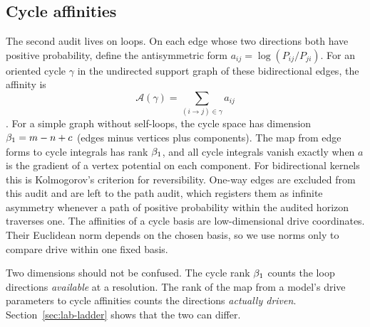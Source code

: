 \subsection{Cycle affinities}\label{sec:cycles}

The second audit lives on loops. On each edge whose two directions both have positive probability, define the antisymmetric form \(a_{ij}=\log(P_{ij}/P_{ji})\). For an oriented cycle \(\gamma\) in the undirected support graph of these bidirectional edges, the affinity is
\[
\mathcal A(\gamma)=\sum_{(i\to j)\in\gamma}a_{ij}
\]
\cite{schnakenberg1976network,esposito2010threefaces}. For a simple graph without self-loops, the cycle space has dimension \(\beta_1=m-n+c\) (edges minus vertices plus components). The map from edge forms to cycle integrals has rank \(\beta_1\), and all cycle integrals vanish exactly when \(a\) is the gradient of a vertex potential on each component. For bidirectional kernels this is Kolmogorov's criterion for reversibility. One-way edges are excluded from this audit and are left to the path audit, which registers them as infinite asymmetry whenever a path of positive probability within the audited horizon traverses one. The affinities of a cycle basis are low-dimensional drive coordinates. Their Euclidean norm depends on the chosen basis, so we use norms only to compare drive within one fixed basis.

Two dimensions should not be confused. The cycle rank \(\beta_1\) counts the loop directions \emph{available} at a resolution. The rank of the map from a model's drive parameters to cycle affinities counts the directions \emph{actually driven}. Section~\ref{sec:lab-ladder} shows that the two can differ.
